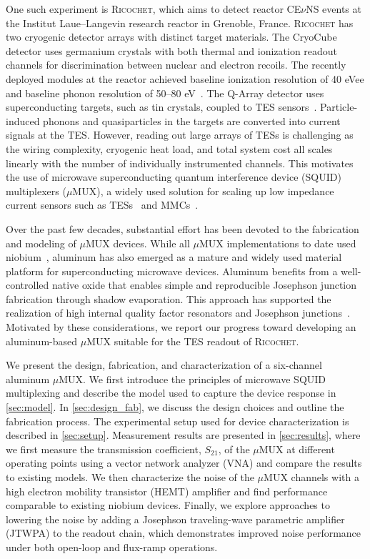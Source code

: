 \documentclass[
 prd,
 reprint,
 superscriptaddress,
 amsmath,amssymb,
 aps,
 floatfix,
]{revtex4-2}
\newcommand{\ricochet}{\textsc{Ricochet}\xspace}
\newcommand{\cevns}{CE$\nu$NS\xspace}
\newcommand{\uMUX}{$\mu$MUX\xspace}
\begin{document}
One such experiment is \ricochet, which aims to detect reactor \cevns events at the Institut Laue--Langevin research reactor in Grenoble, France. \ricochet has two cryogenic detector arrays with distinct target materials. The CryoCube detector uses germanium crystals with both thermal and ionization readout channels for discrimination between nuclear and electron recoils. The recently deployed modules at the reactor achieved baseline ionization resolution of 40 eVee and baseline phonon resolution of 50--80 eV~\cite{armatol_characterization_2025}. The Q-Array detector uses superconducting targets, such as tin crystals, coupled to TES sensors~\cite{augier_results_2023}. Particle-induced phonons and quasiparticles in the targets are converted into current signals at the TES. However, reading out large arrays of TESs is challenging as the wiring complexity, cryogenic heat load, and total system cost all scales linearly with the number of individually instrumented channels. This motivates the use of microwave superconducting quantum interference device (SQUID) multiplexers (\uMUX), a widely used solution for scaling up low impedance current sensors such as TESs~\cite{bennett_integration_2015,mates_simultaneous_2017,becker_working_2019,szypryt_tabletop_2023,satterthwaite_simons_2024} and MMCs~\cite{kempf_design_2017, neidig_full-scale_2025}.

Over the past few decades, substantial effort has been devoted to the fabrication and modeling of \uMUX devices. While all \uMUX implementations to date used niobium~\cite{mates_microwave_2011, kempf_design_2017, nakashima_adjustable_2017, song_design_2026}, aluminum has also emerged as a mature and widely used material platform for superconducting microwave devices. Aluminum benefits from a well-controlled native oxide that enables simple and reproducible Josephson junction fabrication through shadow evaporation. This approach has supported the realization of high internal quality factor resonators and Josephson junctions~\cite{melville_comparison_2020, gingras_improving_2025}. Motivated by these considerations, we report our progress toward developing an aluminum-based \uMUX suitable for the TES readout of \ricochet.

We present the design, fabrication, and characterization of a six-channel aluminum \uMUX. We first introduce the principles of microwave SQUID multiplexing and describe the model used to capture the device response in \cref{sec:model}. In \cref{sec:design_fab}, we discuss the design choices and outline the fabrication process. The experimental setup used for device characterization is described in \cref{sec:setup}. Measurement results are presented in \cref{sec:results}, where we first measure the transmission coefficient, $S_{21}$, of the \uMUX at different operating points using a vector network analyzer (VNA) and compare the results to existing models. We then characterize the noise of the \uMUX channels with a high electron mobility transistor (HEMT) amplifier and find performance comparable to existing niobium devices. Finally, we explore approaches to lowering the noise by adding a Josephson traveling-wave parametric amplifier (JTWPA) to the readout chain, which demonstrates improved noise performance under both open-loop and flux-ramp operations.
\end{document}
